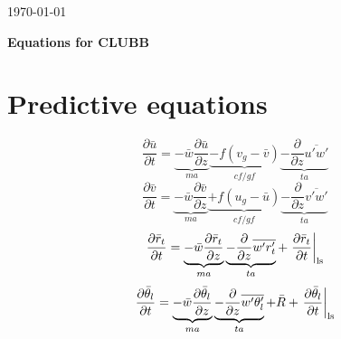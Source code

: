 \documentclass[11pt,fleqn]{article}
\newcommand{\ptlder}[2]{\frac{\partial #1}{\partial #2}}
\begin{document}
\begin{flushright} \today \end{flushright}

\vspace*{.1in}
\begin{center}  {\Large\bf Equations for CLUBB}  \end{center}
\vspace*{.1in}

\section{Predictive equations}

\begin{equation}
\label{eq_um}
\ptlder{\bar{u}}{t} 
= \underbrace{ - \bar{w}\ptlder{\bar{u}}{z} }_{ma}
  \underbrace{ - f (v_g - \bar{v}) }_{cf/gf}
  \underbrace{ - \ptlder{}{z}\overline{u'w'} }_{ta} 
\end{equation}
%
\begin{equation}
\label{eq_vm}
\ptlder{\bar{v}}{t} 
= \underbrace{ - \bar{w}\ptlder{\bar{v}}{z} }_{ma}
  \underbrace{ + f (u_g - \bar{u}) }_{cf/gf}
  \underbrace{ - \ptlder{}{z}\overline{v'w'} }_{ta}
\end{equation}
%
\begin{equation}
\label{eq_rtm}
\ptlder{\bar{r}_t}{t}
= \underbrace{ - \bar{w}\ptlder{\bar{r}_t}{z} }_{ma}
  \underbrace{ - \ptlder{}{z}\overline{w'r'_t} }_{ta}
  + \left. \ptlder{\bar{r}_t}{t} \right|_{\rm{ls}}
\end{equation}
%
\begin{equation}
\label{eq_thlm}
\ptlder{\bar{\theta}_l}{t} 
= \underbrace{ - \bar{w}\ptlder{\bar{\theta}_l}{z} }_{ma}
  \underbrace{ - \ptlder{}{z}\overline{w'\theta'_l} }_{ta} 
  + \bar{R}   
  + \left. \ptlder{\bar{\theta}_l}{t} \right|_{\rm{ls}}
\end{equation}
%
\end{document}
